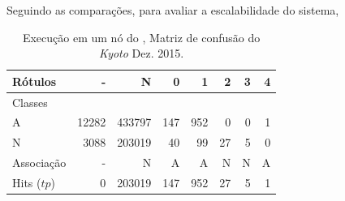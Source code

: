 




Seguindo as comparações, para avaliar a escalabilidade do sistema, 


\begin{table}[hbt]
  \centering
  \caption{Execução em um nó do \mfog, Matriz de confusão do \dataset \emph{Kyoto} Dez. 2015.}
  \label{tab:single-matrix}
  \begin{tabular}{l|r|r|r|r|r|r|r}
    Rótulos &      - &       N &    0 &    1 &   2 &  3 &  4 \\\hline
    Classes  &        &         &      &      &     &    &    \\\hline
    \hline
    A        &  12282 &  433797 &  147 &  952 &   0 &  0 &  1 \\\hline
    N        &   3088 &  203019 &   40 &   99 &  27 &  5 &  0 \\\hline
    \hline
    Associação &      - &       N &    A &    A &   N &  N &  A \\\hline
    Hits ($tp$)     &      0 &  203019 &  147 &  952 &  27 &  5 &  1 
  \end{tabular}
\end{table}


